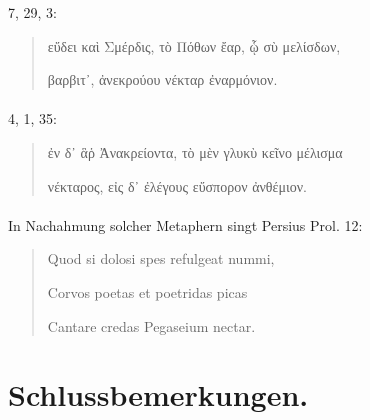 \documentclass[a4paper, 11pt, oneside]{article}
\begin{document}
7, 29, 3:
\begin{quotation}
εὔδει καὶ Σμέρδις, τὸ Πόθων ἔαρ, ᾧ σὺ μελίσδων,

βαρβιτ᾽, ἀνεκρούου νέκταρ ἐναρμόνιον.
\end{quotation}
\paragraph{}
4, 1, 35:
\begin{quotation}
ἐν δ᾽ ἃῥ Ἀνακρείοντα, τὸ μὲν γλυκὺ κεῖνο μέλισμα

νέκταρος, εἰς δ᾽ ἐλέγους εὔσπορον ἀνθέμιον.
\end{quotation}
\paragraph{}
In Nachahmung solcher Metaphern singt Persius Prol. 12:
\begin{quotation}
Quod si dolosi spes refulgeat nummi,

Corvos poetas et poetridas picas

Cantare credas Pegaseium nectar.
\end{quotation}
\paragraph{}
\clearpage
\section{Schlussbemerkungen.}
\end{document}

